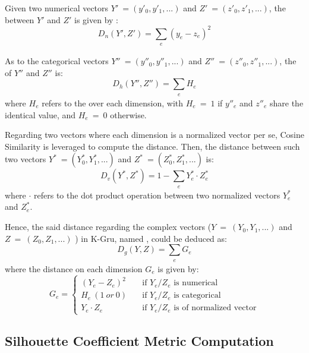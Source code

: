 Given two numerical vectors $Y'\ = (y'_0, y'_1, ...)$ and $Z'\ = (z'_0, z'_1, ...)$, the \od{} \cite{IEEEexample:books/mk/HanKP2011} between $Y'$ and $Z'$ is given by :
%
\begin{equation}
\label{eq:od}
D_n(Y', Z') = \sum_{\substack{e}} (y_e - z_e)^2
\end{equation}

As to the categorical vectors $Y''\ = (y''_0, y''_1, ...)$ and  $Z''\ = (z''_0, z''_1, ...)$, the \hd{} \cite{IEEEexample:huang1997clustering} of $Y''$ and $Z''$ is:
%
\begin{equation}
\label{eq:hd}
D_h(Y'', Z'') = \sum_{\substack{e}} H_e
\end{equation}
where $H_e$ refers to the \hd{} over each dimension, with $H_e\ =\ 1$ if $y''_e$ and $z''_e$ share the identical value, and $H_e\ =\ 0$ otherwise.

Regarding two vectors where each dimension is a normalized vector per se, Cosine Similarity is leveraged to compute the distance.
Then, the distance between such two vectors $Y^{\ast}\ = (Y^{\ast}_0, Y^{\ast}_1, ...)$ and $Z^{\ast}\ = (Z^{\ast}_0, Z^{\ast}_1, ...)$ is:
%
\begin{equation}
\label{eq:vd}
D_v(Y^{\ast}, Z^{\ast}) = 1- \sum_{\substack{e}} Y^{\ast}_e \cdot Z^{\ast}_e
\end{equation}
where $\cdot$ refers to the dot product operation between two normalized vectors $Y^{\ast}_e$ and $Z^{\ast}_e$.

Hence, the said distance regarding the complex vectors ($Y\ =\ (Y_0, Y_1, ...)$ and $Z\ =\ (Z_0, Z_1, ...)$ ) in K-Gru, named \gd{}, could be deduced as:
%
\begin{equation}
\label{eq:gd}
D_g(Y, Z) = \sum_{\substack{e}} G_e
\end{equation}
where the distance on each dimension $G_e$ is given by:
%
\begin{equation}
\label{eq:ge}
G_e =
  \begin{cases}
    (Y_e - Z_e)^2       & \quad \text{if } Y_e/Z_e \text{ is numerical}\\
    H_e\ (1\ or\ 0)       	& \quad \text{if } Y_e/Z_e \text{ is categorical}\\
    Y_e \cdot Z_e  		& \quad \text{if } Y_e/Z_e \text{ is of normalized vector}
  \end{cases}
\end{equation}


\subsection{Silhouette Coefficient Metric Computation}
\label{sec:compu}

